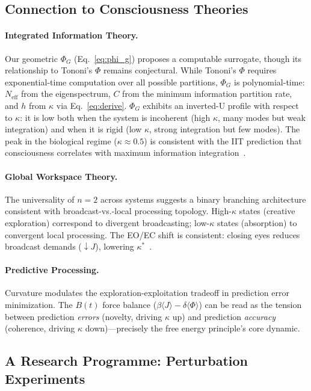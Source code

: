 \documentclass[letterpaper]{article}
\begin{document}
\subsection{Connection to Consciousness Theories}

\paragraph{Integrated Information Theory.}
Our geometric $\Phi_G$ (Eq.~\ref{eq:phi_g}) proposes a
computable surrogate, though its relationship to
Tononi's $\Phi$ remains conjectural.
While Tononi's $\Phi$ requires exponential-time
computation over all possible partitions, $\Phi_G$
is polynomial-time: $N_\mathrm{eff}$ from the
eigenspectrum, $C$ from the minimum information
partition rate, and $h$ from $\kappa$ via
Eq.~\eqref{eq:derive}.
$\Phi_G$ exhibits an inverted-U profile with respect
to $\kappa$: it is low both when the system is
incoherent (high $\kappa$, many modes but weak
integration) and when it is rigid (low $\kappa$, strong
integration but few modes).
The peak in the biological regime ($\kappa\approx0.5$)
is consistent with the IIT prediction that consciousness
correlates with maximum information
integration~\citep{tononi2004}.

\paragraph{Global Workspace Theory.}
The universality of $n=2$ across systems suggests a
binary branching architecture consistent with
broadcast-vs.-local processing topology.
High-$\kappa$ states (creative exploration)
correspond to divergent broadcasting; low-$\kappa$
states (absorption) to convergent local processing.
The EO/EC shift is consistent: closing eyes reduces
broadcast demands ($\downarrow J$), lowering
$\kappa^*$~\citep{baars2005}.

\paragraph{Predictive Processing.}
Curvature modulates the exploration-exploitation
tradeoff in prediction error minimization.
The $B(t)$ force balance
($\beta\langle J\rangle-\delta\langle\Phi\rangle$) can
be read as the tension between prediction
\emph{errors} (novelty, driving $\kappa$ up) and
prediction \emph{accuracy} (coherence, driving
$\kappa$ down)---precisely the free energy principle's
core dynamic.

\subsection{A Research Programme: Perturbation
Experiments}
\end{document}
